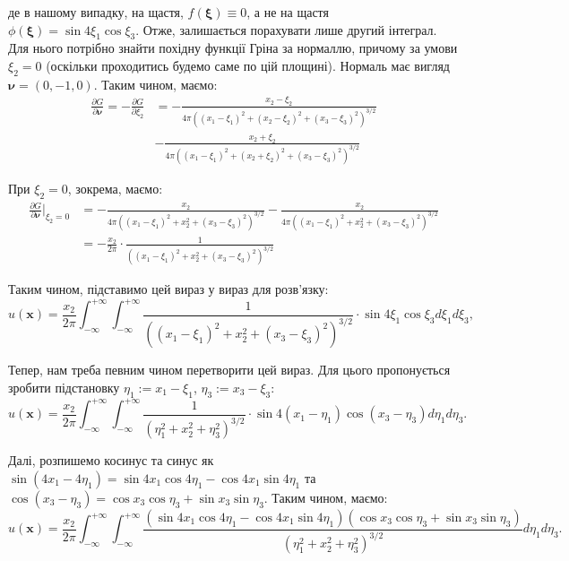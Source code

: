 \documentclass{hw_template}
\begin{document}
де в нашому випадку, на щастя, $f(\boldsymbol{\xi}) \equiv 0$, а не на щастя
$\phi(\boldsymbol{\xi}) = \sin 4\xi_1 \cos \xi_3$. Отже, залишається порахувати
лише другий інтеграл. Для нього потрібно знайти похідну функції Гріна за
нормаллю, причому за умови $\xi_2=0$ (оскільки проходитись будемо саме по цій
площині). Нормаль має вигляд $\boldsymbol{\nu} = (0,-1,0)$. Таким чином, маємо:
\begin{align*}
    \frac{\partial G}{\partial\boldsymbol{\nu}} = -\frac{\partial G}{\partial \xi_2} &= -\frac{x_2-\xi_2}{4\pi((x_1-\xi_1)^2+(x_2-\xi_2)^2+(x_3-\xi_3)^2)^{3/2}}\\
    &-\frac{x_2+\xi_2}{4\pi((x_1-\xi_1)^2+(x_2+\xi_2)^2+(x_3-\xi_3)^2)^{3/2}}
\end{align*}

При $\xi_2=0$, зокрема, маємо:
\begin{align*}
    \frac{\partial G}{\partial\boldsymbol{\nu}}\Big|_{\xi_2=0} &= -\frac{x_2}{4\pi((x_1-\xi_1)^2+x_2^2+(x_3-\xi_3)^2)^{3/2}} - \frac{x_2}{4\pi((x_1-\xi_1)^2+x_2^2+(x_3-\xi_3)^2)^{3/2}} \\
    &= -\frac{x_2}{2\pi}\cdot \frac{1}{((x_1-\xi_1)^2+x_2^2+(x_3-\xi_3)^2)^{3/2}}
\end{align*}

Таким чином, підставимо цей вираз у вираз для розв'язку:
\begin{equation*}
    u(\mathbf{x}) = \frac{x_2}{2\pi}\int_{-\infty}^{+\infty}\int_{-\infty}^{+\infty} \frac{1}{((x_1-\xi_1)^2+x_2^2+(x_3-\xi_3)^2)^{3/2}} \cdot \sin 4\xi_1 \cos \xi_3d\xi_1d\xi_3,
\end{equation*}

Тепер, нам треба певним чином перетворити цей вираз. Для цього пропонується зробити 
підстановку $\eta_1 := x_1-\xi_1$, $\eta_3 := x_3-\xi_3$:
\begin{equation*}
    u(\mathbf{x}) = \frac{x_2}{2\pi}\int_{-\infty}^{+\infty}\int_{-\infty}^{+\infty} \frac{1}{(\eta_1^2+x_2^2+\eta_3^2)^{3/2}} \cdot \sin 4(x_1-\eta_1) \cos (x_3-\eta_3)d\eta_1d\eta_3.
\end{equation*}

Далі, розпишемо косинус та синус як $\sin (4x_1-4\eta_1) = \sin 4x_1 \cos 4\eta_1 - \cos 4x_1\sin 4\eta_1$ та $\cos (x_3-\eta_3) = \cos x_3 \cos \eta_3 + \sin x_3 \sin \eta_3$. Таким чином, маємо:
\begin{equation*}
    u(\mathbf{x}) = \frac{x_2}{2\pi}\int_{-\infty}^{+\infty}\int_{-\infty}^{+\infty} \frac{(\sin 4x_1 \cos 4\eta_1 - \cos 4x_1\sin 4\eta_1)(\cos x_3 \cos \eta_3 + \sin x_3 \sin \eta_3)}{(\eta_1^2+x_2^2+\eta_3^2)^{3/2}}d\eta_1d\eta_3.
\end{equation*}
\end{document}
